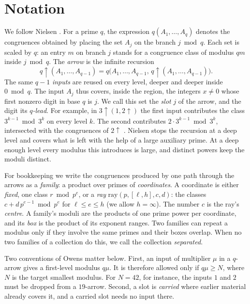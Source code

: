 \documentclass[11pt]{amsart}
\theoremstyle{definition}
\theoremstyle{remark}
\newcommand{\up}{{\uparrow}}
\newcommand{\ray}{\mathrm{ray}}
\begin{document}
\section{Notation}\label{sec:notation}

We follow Nielsen \cite[§2]{Nielsen09}. For a prime $q$, the expression $q(A_1,\dots,A_q)$ denotes the congruences
obtained by placing the set $A_j$ on the branch $j \bmod q$. Each set is scaled by $q$: an entry $m$ on branch $j$
stands for a congruence class of modulus $qm$ inside $j \bmod q$. The \emph{arrow} is the infinite recursion
\[
q\up(A_1,\dots,A_{q-1}) = q\bigl(A_1,\dots,A_{q-1},\,q\up(A_1,\dots,A_{q-1})\bigr).
\]
The same $q-1$ \emph{inputs} are reused on every level, deeper and deeper inside $0 \bmod q$. The input $A_j$ thus
covers, inside the region, the integers $x\ne0$ whose first nonzero digit in base $q$ is $j$. We call this set the
\emph{slot} $j$ of the arrow, and the digit its \emph{$q$-lead}. For example, in $3\up(1,2\up)$ the first input
contributes the class $3^{k-1} \bmod 3^k$ on every level $k$. The second contributes $2\cdot 3^{k-1} \bmod 3^k$,
intersected with the congruences of $2\up$ \cite[Example~1]{Nielsen09}. Nielsen stops the recursion at a deep level
and covers what is left with the help of a large auxiliary prime. At a deep enough level every modulus this introduces
is large, and distinct powers keep the moduli distinct.

For bookkeeping we write the congruences produced by one path through the arrows as a \emph{family}: a product over
primes of \emph{coordinates}. A coordinate is either \emph{fixed}, one class $r \bmod p^e$, or a \emph{ray}
$\ray(p,[\ell,h],c,d)$: the classes $c+d\,p^{e-1} \bmod p^e$ for $\ell\le e\le h$ (we allow $h=\infty$). The number
$c$ is the ray's \emph{centre}. A family's moduli are the products of one prime power per coordinate, and its
\emph{box} is the product of its exponent ranges. Two families can repeat a modulus only if they involve the same
primes and their boxes overlap. When no two families of a collection do this, we call the collection
\emph{separated}.

Two conventions of Owens \cite{Owens14} matter below. First, an input of multiplier $\mu$ in a $q$-arrow gives a
first-level modulus $q\mu$. It is therefore allowed only if $q\mu\ge N$, where $N$ is the target smallest modulus. For
$N=42$, for instance, the inputs $1$ and $2$ must be dropped from a $19$-arrow. Second, a slot is \emph{carried}
where earlier material already covers it, and a carried slot needs no input there.
\end{document}
